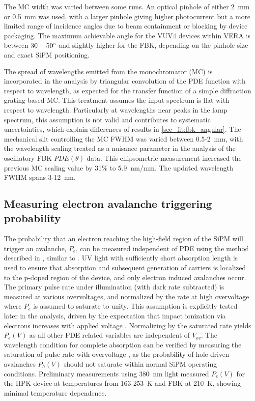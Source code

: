 The MC width was varied between some runs. An optical pinhole of either 2~mm or 0.5~mm was used, with a larger pinhole giving higher photocurrent but a more limited range of incidence angles due to beam containment or blocking by device packaging. The maximum achievable angle for the VUV4 devices within VERA is between $30-50^\circ$ and slightly higher for the FBK, depending on the pinhole size and exact SiPM positioning.

The spread of wavelengths emitted from the monochromator (MC) is incorporated in the analysis by triangular convolution of the PDE function with respect to wavelength, as expected for the transfer function of a simple diffraction grating based MC. This treatment assumes the input spectrum is flat with respect to wavelength. Particularly at wavelengths near peaks in the lamp spectrum, this assumption is not valid and contributes to systematic uncertainties, which explain differences of results in \autoref{sec_fit:fbk_angular}. The mechanical slit controlling the MC FWHM was varied between 0.5-2~mm, with the wavelength scaling treated as a nuisance parameter in the analysis of the oscillatory FBK $PDE(\theta)$ data. This ellipsometric measurement increased the previous MC scaling value by 31\% to 5.9~nm/mm. The updated wavelength FWHM spans 3-12~nm.


\subsection{Measuring electron avalanche triggering probability}
\label{sec:pe_vs_temp}

The probability that an electron reaching the high-field region of the SiPM will trigger an avalanche, $P_e$, can be measured independent of PDE using the method described in \cite{Lewis_2025_qy}, similar to \cite{Zappala_2016_efficiency}. UV light with sufficiently short absorption length is used to ensure that absorption and subsequent generation of carriers is localized to the p-doped region of the device, and only electron induced avalanches occur. The primary pulse rate under illumination (with dark rate subtracted) is measured at various overvoltages, and normalized by the rate at high overvoltage where $P_e$ is assumed to saturate to unity. This assumption is explicitly tested later in the analysis, driven by the expectation that impact ionization via electrons increases with applied voltage \cite{oldham_avalanche, mcintyre_microplasma, mcintyre_avalanche_1973}. Normalizing by the saturated rate yields $P_e(V)$ as all other PDE related variables are independent of $V_{ov}$. The wavelength condition for complete absorption can be verified by measuring the saturation of pulse rate with overvoltage \cite{gallina_avalanche_2019}, as the probability of hole driven avalanches $P_h(V)$ should not saturate within normal SiPM operating conditions. Preliminary measurements using 380~nm light measured $P_e(V)$ for the HPK device at temperatures from 163-253~K and FBK at 210~K, showing minimal temperature dependence.
